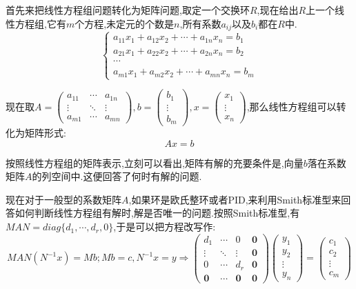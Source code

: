 首先来把线性方程组问题转化为矩阵问题,取定一个交换环$R$,现在给出$R$上一个线性方程组,它有$m$个方程,未定元的个数是$n$,所有系数$a_{ij}$以及$b_i$都在$R$中.
$$\left\{\begin{array}{c}
a_{11}x_1+a_{12}x_2+\cdots+a_{1n}x_n=b_1\\
a_{21}x_1+a_{22}x_2+\cdots+a_{2n}x_n=b_2\\
\cdots\\
a_{m1}x_1+a_{m2}x_2+\cdots+a_{mn}x_n=b_m
\end{array}\right.$$

现在取$A=\left(\begin{array}{ccc}
a_{11}&\cdots&a_{1n}\\
\vdots&\ddots&\vdots\\
a_{m1}&\cdots&a_{mn}\end{array}\right),b=\left(\begin{array}{c}
b_1\\
\vdots\\
b_m\end{array}\right),x=\left(\begin{array}{c}
x_1\\
\vdots\\
x_n\end{array}\right)$,那么线性方程组可以转化为矩阵形式:
$$Ax=b$$

按照线性方程组的矩阵表示,立刻可以看出,矩阵有解的充要条件是,向量$b$落在系数矩阵$A$的列空间中.这便回答了何时有解的问题.

现在对于一般型的系数矩阵$A$,如果环是欧氏整环或者PID,来利用Smith标准型来回答如何判断线性方程组有解时,解是否唯一的问题.按照Smith标准型,有$MAN=diag\{d_1,\cdots,d_r,0\}$,于是可以把方程改写作:
$$MAN(N^{-1}x)=Mb;Mb=c,N^{-1}x=y\Rightarrow \left(\begin{array}{cccc}
d_1&\cdots&0&\textbf{0}\\
\vdots&\ddots&\vdots&\textbf{0}\\
0&\cdots&d_r&\textbf{0}\\
\textbf{0}&\cdots&\textbf{0}&\textbf{0}
\end{array}\right)
\left(\begin{array}{c}
y_1\\
y_2\\
\vdots\\
y_n
\end{array}\right)
=
\left(\begin{array}{c}
c_1\\
c_2\\
\vdots\\
c_m
\end{array}\right)$$

